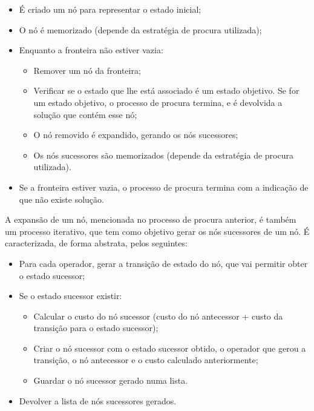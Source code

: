 \begin{itemize}
    \item É criado um nó para representar o estado inicial;
    \item O nó é memorizado (depende da estratégia de procura utilizada);
    \item Enquanto a fronteira não estiver vazia:
    \begin{itemize}
        \item Remover um nó da fronteira;
        \item Verificar se o estado que lhe está associado é um estado objetivo.
        Se for um estado objetivo, o processo de procura termina, e é devolvida a solução que contém esse nó;
        \item O nó removido é expandido, gerando os nós sucessores;
        \item Os nós sucessores são memorizados (depende da estratégia de procura utilizada).
    \end{itemize}
    \item Se a fronteira estiver vazia, o processo de procura termina com a indicação de que não existe solução.
\end{itemize}

A expansão de um nó, mencionada no processo de procura anterior, é também um processo iterativo, que tem como objetivo gerar os nós sucessores de um nó.
É caracterizada, de forma abstrata, pelos seguintes:

\begin{itemize}
    \item Para cada operador, gerar a transição de estado do nó, que vai permitir obter o estado sucessor;
    \item Se o estado sucessor existir:
    \begin{itemize}
        \item Calcular o custo do nó sucessor (custo do nó antecessor + custo da transição para o estado sucessor);
        \item Criar o nó sucessor com o estado sucessor obtido, o operador que gerou a transição, o nó antecessor e o custo calculado anteriormente;
        \item Guardar o nó sucessor gerado numa lista.
    \end{itemize}
    \item Devolver a lista de nós sucessores gerados.
\end{itemize}

